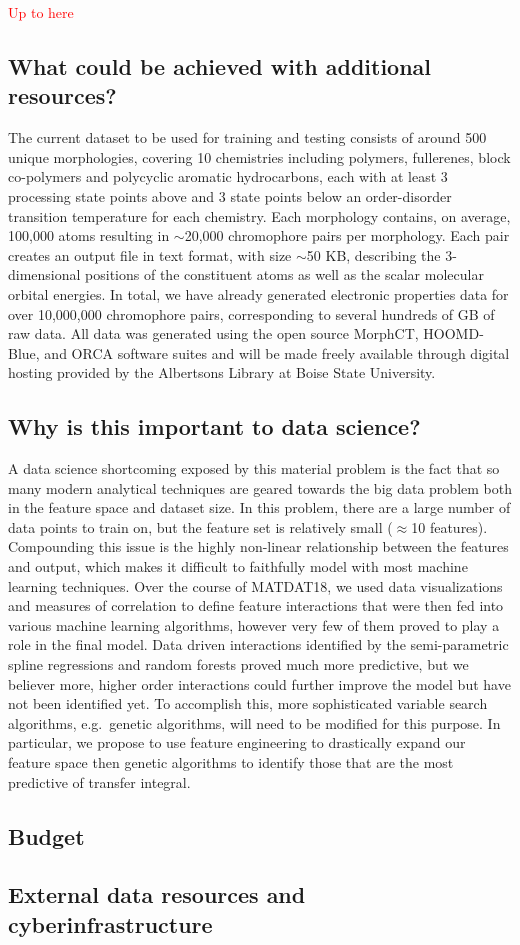 \documentclass[12pt]{article}
\begin{document}
\textcolor{red}{Up to here}


\subsection{What could be achieved with additional resources?}

The current dataset to be used for training and testing consists of around 500 unique morphologies, covering 10 chemistries including polymers, fullerenes, block co-polymers and polycyclic aromatic hydrocarbons, each with at least 3 processing state points above and 3 state points below an order-disorder transition temperature for each chemistry.
Each morphology contains, on average, 100,000 atoms resulting in $\sim$20,000 chromophore pairs per morphology.
Each pair creates an output file in text format, with size $\sim$50 KB, describing the 3-dimensional positions of the constituent atoms as well as the scalar molecular orbital energies.
In total, we have already generated electronic properties data for over 10,000,000 chromophore pairs, corresponding to several hundreds of GB of raw data.
All data was generated using the open source MorphCT\cite{MorphCT,Jones2017}, HOOMD-Blue\cite{Anderson08}, and ORCA\cite{Neese2012b} software suites and will be made freely available through digital hosting provided by the Albertsons Library at Boise State University.


\subsection{Why is this important to data science?}

A data science shortcoming exposed by this material problem is the fact that so many modern analytical techniques are geared towards the big data problem both in the feature space and dataset size.  In this problem, there are a large number of data points to train on, but the feature set is relatively small ($\approx$10 features).  Compounding this issue is the highly non-linear relationship between the features and output, which makes it difficult to faithfully model with most machine learning techniques.  Over the course of MATDAT18, we used data visualizations and measures of correlation to define feature interactions that were then fed into various machine learning algorithms, however very few of them proved to play a role in the final model.  Data driven interactions identified by the semi-parametric spline regressions and random forests proved much more predictive, but we believer more, higher order interactions could further improve the model but have not been identified yet.  To accomplish this, more sophisticated variable search algorithms, e.g.~genetic algorithms, will need to be modified for this purpose.  In particular, we propose to use feature engineering to drastically expand our feature space then genetic algorithms to identify those that are the most predictive of transfer integral.

\subsection{Budget}

\subsection{External data resources and cyberinfrastructure}


\newpage




\end{document}
